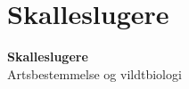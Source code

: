 \section{Skalleslugere}

\begin{frame}
  \vspace{3em}
  \begin{center}
    {\LARGE \textbf{Skalleslugere}}
    \vspace{2em}
    \\ Artsbestemmelse og vildtbiologi
\par
{\normalsize }
\vspace{1em}
\par
  \end{center}
\end{frame}





